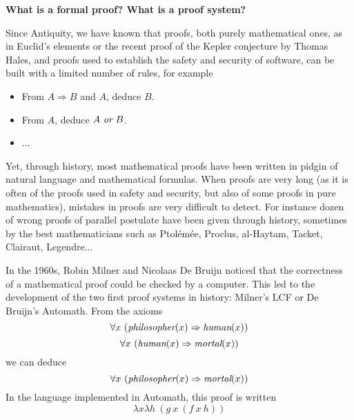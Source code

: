 \begin{framed}
  \begin{center}
    {\bf What is a formal proof? What is a proof system?}
    \end{center}
        
Since Antiquity, we have known that
proofs, both purely mathematical ones, as in Euclid's elements or the
recent proof of the Kepler conjecture by Thomas Hales, and proofs used
to establish the safety and security of software, can be built with a
limited number of rules, for example
\begin{itemize}
\item From $A \Rightarrow B$ and $A$, deduce $B$.
\item From $A$, deduce $A~\mbox{\it or}~B$.
\item ...
\end{itemize}
Yet, through history, most mathematical proofs have been written in
pidgin of natural language and mathematical formulas. When proofs are
very long (as it is often of the proofs used in safety and security,
but also of some proofs in pure mathematics), mistakes in proofs are
very difficult to detect. For instance dozen of wrong proofs of
parallel postulate have been given through history, sometimes by the
best mathematicians such as Ptolémée, Proclus, al-Haytam, Tacket,
Clairaut, Legendre...

In the 1960s, Robin Milner and Nicolaas De Bruijn noticed that the
correctness of a mathematical proof could be checked by a
computer. This led to the development of the two first proof systems
in history: Milner's LCF or De Bruijn's Automath.  From
the axioms
$$\forall x~(\mbox{\em philosopher}(x) \Rightarrow \mbox{\em human}(x))$$
$$\forall x~(\mbox{\em human}(x) \Rightarrow \mbox{\em mortal}(x))$$
we can deduce
$$\forall x~(\mbox{\em philosopher}(x) \Rightarrow \mbox{\em mortal}(x))$$
In the language implemented in Automath, this proof is written
$$\lambda x \lambda h~(g~x~(f~x~h))$$
\end{framed}

